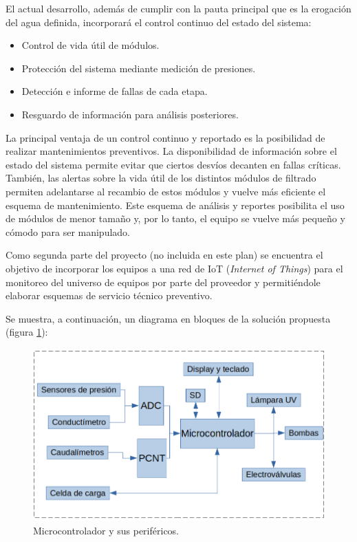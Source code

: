 \documentclass[
11pt, %
]{charter}
\begin{document}
El actual desarrollo, además de cumplir con la pauta principal que es la erogación del agua definida, incorporará el control continuo del estado del sistema:
\begin{itemize}
	\item Control de vida útil de módulos.
	\item Protección del sistema mediante medición de presiones.
	\item Detección e informe de fallas de cada etapa.
	\item Resguardo de información para análisis posteriores.
\end{itemize}

La principal ventaja de un control continuo y reportado es la posibilidad de realizar mantenimientos preventivos. La disponibilidad de información sobre el estado del sistema permite evitar que ciertos desvíos decanten en fallas críticas. 
También, las alertas sobre la vida útil de los distintos módulos de filtrado permiten adelantarse al recambio de estos módulos y vuelve más eficiente el esquema de mantenimiento. Este esquema de análisis y reportes posibilita el uso de módulos de menor tamaño y, por lo tanto, el equipo se vuelve más pequeño y cómodo para ser manipulado.


Como segunda parte del proyecto (no incluida en este plan) se encuentra el objetivo de incorporar los equipos a una red de IoT (\textit{Internet of Things}) para el monitoreo del universo de equipos por parte del proveedor y permitiéndole elaborar esquemas de servicio técnico preventivo.

Se muestra, a continuación, un diagrama en bloques de la solución propuesta (figura \ref{fig:microcontroladorConexiones}):

\begin{figure}[htpb]
\centering 
\includegraphics[width=.7\textwidth]{./Figuras/Microcontrolador y sus perifericos.png}
\caption{Microcontrolador y sus periféricos.}
\label{fig:microcontroladorConexiones}
\end{figure}
\end{document}

